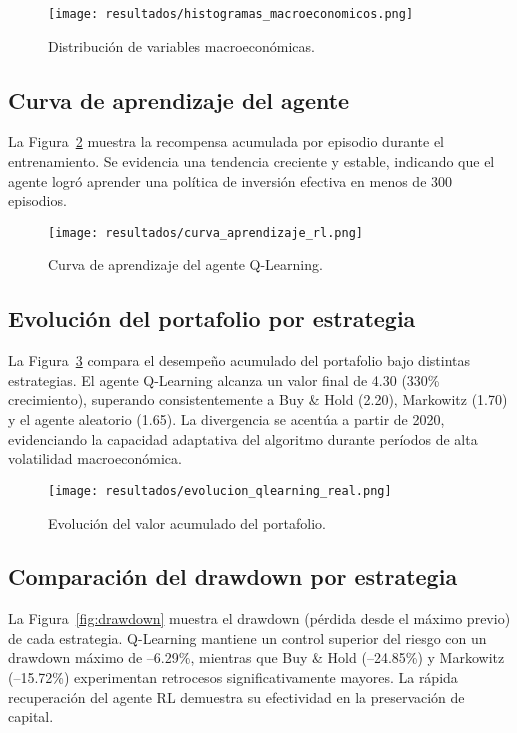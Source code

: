 \documentclass[conference]{IEEEtran}
\begin{document}
	\begin{figure}[ht]
		\centering
		\texttt{[image: resultados/histogramas\_macroeconomicos.png]}
		\caption{Distribución de variables macroeconómicas.}
		\label{fig:histogramas}
	\end{figure}
	
	\subsection{Curva de aprendizaje del agente}
	
	La Figura~\ref{fig:curva} muestra la recompensa acumulada por episodio durante el entrenamiento. Se evidencia una tendencia creciente y estable, indicando que el agente logró aprender una política de inversión efectiva en menos de 300 episodios.
	
	\begin{figure}[ht]
		\centering
		\texttt{[image: resultados/curva\_aprendizaje\_rl.png]}
		\caption{Curva de aprendizaje del agente Q-Learning.}
		\label{fig:curva}
	\end{figure}
	
	\subsection{Evolución del portafolio por estrategia}
	
	La Figura~\ref{fig:evolucion} compara el desempeño acumulado del portafolio bajo distintas estrategias. El agente Q-Learning alcanza un valor final de 4.30 (330\% crecimiento), superando consistentemente a Buy \& Hold (2.20), Markowitz (1.70) y el agente aleatorio (1.65). La divergencia se acentúa a partir de 2020, evidenciando la capacidad adaptativa del algoritmo durante períodos de alta volatilidad macroeconómica.
	
	\begin{figure}[ht]
		\centering
		\texttt{[image: resultados/evolucion\_qlearning\_real.png]}
		\caption{Evolución del valor acumulado del portafolio.}
		\label{fig:evolucion}
	\end{figure}
	
	\subsection{Comparación del drawdown por estrategia}
	
	La Figura~\ref{fig:drawdown} muestra el drawdown (pérdida desde el máximo previo) de cada estrategia. Q-Learning mantiene un control superior del riesgo con un drawdown máximo de --6.29\%, mientras que Buy \& Hold (--24.85\%) y Markowitz (--15.72\%) experimentan retrocesos significativamente mayores. La rápida recuperación del agente RL demuestra su efectividad en la preservación de capital.
	
\end{document}
